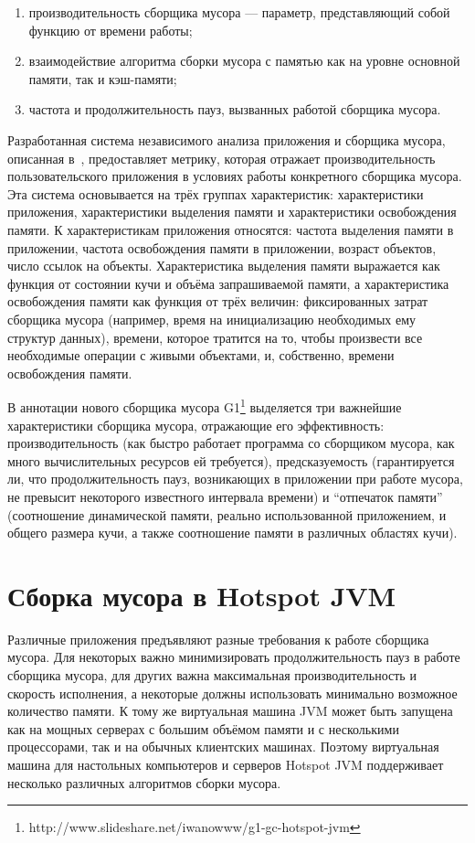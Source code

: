 \begin{enumerate}
\item производительность сборщика мусора --- параметр, представляющий собой функцию от
времени работы;
\item взаимодействие алгоритма сборки мусора с памятью как на уровне основной памяти, так и кэш-памяти;
\item частота и продолжительность пауз, вызванных работой сборщика мусора.
\end{enumerate}

Разработанная система независимого анализа приложения и сборщика мусора,
описанная в~\cite{book:HBench}, предоставляет метрику, которая отражает производительность
пользовательского приложения в условиях работы конкретного сборщика мусора. Эта система
основывается на трёх группах характеристик: характеристики приложения, характеристики 
выделения памяти и характеристики освобождения памяти. К характеристикам приложения
относятся: частота выделения памяти в приложении, частота освобождения памяти в приложении,
возраст объектов, число ссылок на объекты. Характеристика выделения памяти выражается
как функция от состоянии кучи и объёма запрашиваемой памяти, а характеристика освобождения
памяти как функция от трёх величин: фиксированных затрат сборщика мусора (например,
время на инициализацию необходимых ему структур данных), времени, которое тратится
на то, чтобы произвести все необходимые операции с живыми объектами, и, собственно,
времени освобождения памяти.

В аннотации нового сборщика мусора G1\footnote{http://www.slideshare.net/iwanowww/g1-gc-hotspot-jvm}
выделяется три важнейшие характеристики сборщика мусора, отражающие его эффективность:
производительность (как быстро работает программа со сборщиком мусора, как много
вычислительных ресурсов ей требуется), предсказуемость (гарантируется ли, что продолжительность 
пауз, возникающих в приложении при работе мусора, не превысит некоторого известного
интервала времени) и ``отпечаток памяти'' (соотношение динамической памяти, реально
использованной приложением, и общего размера кучи, а также соотношение памяти в различных 
областях кучи).

\section {Сборка мусора в Hotspot JVM}

Различные приложения предъявляют разные требования к работе сборщика мусора. Для некоторых важно минимизировать
продолжительность пауз в работе сборщика мусора, для других важна максимальная 
производительность и скорость исполнения, а некоторые должны использовать минимально
возможное количество памяти. К тому же виртуальная машина JVM может быть запущена
как на мощных серверах с большим объёмом памяти и с несколькими процессорами, так и на 
обычных клиентских машинах. Поэтому виртуальная машина для настольных компьютеров и серверов
Hotspot JVM поддерживает несколько различных алгоритмов сборки
мусора.

